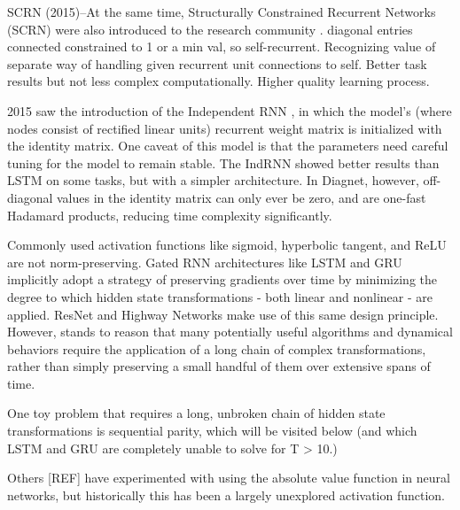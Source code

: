 \documentclass{article}
\begin{document}
SCRN (2015)--At the same time, Structurally Constrained Recurrent Networks (SCRN) were also introduced to the research community \citet{MikolovJCMR14}. diagonal entries connected constrained to 1 or a min val, so self-recurrent.  Recognizing value of separate way of handling given recurrent unit connections to self.  Better task results but not less complex computationally. Higher quality learning process.

2015 saw the introduction of the Independent RNN \citet{LeJH15}, in which the model's (where nodes consist of rectified linear units) recurrent weight matrix is initialized with the identity matrix.  One caveat of this model is that the parameters need careful tuning for the model to remain stable.  The IndRNN showed better results than LSTM on some tasks, but with a simpler architecture.  In Diagnet, however, off-diagonal values in the identity matrix can only ever be zero, and are one-fast Hadamard products, reducing time complexity significantly. 



Commonly used activation functions like sigmoid, hyperbolic tangent, and ReLU are not norm-preserving. Gated RNN architectures like LSTM and GRU implicitly adopt a strategy of preserving gradients over time by minimizing the degree to which hidden state transformations - both linear and nonlinear - are applied. ResNet \citep{2015arXiv151203385H} and Highway Networks \citep{2015arXiv150500387S} make use of this same design principle. However, stands to reason that many potentially useful algorithms and dynamical behaviors require the application of a long chain of complex transformations, rather than simply preserving a small handful of them over extensive spans of time.

One toy problem that requires a long, unbroken chain of hidden state transformations is sequential parity, which will be visited below (and which LSTM and GRU are completely unable to solve for T > 10.)
 

Others \citep{DorobantuSR16} [REF] have experimented with using the absolute value function in neural networks, but historically this has been a largely unexplored activation function.
\end{document}
